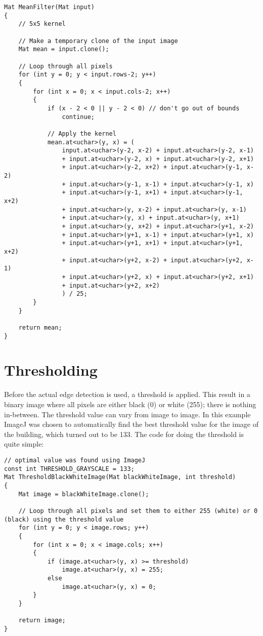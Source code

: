 \begin{lstlisting}
Mat MeanFilter(Mat input)
{
	// 5x5 kernel

	// Make a temporary clone of the input image
	Mat mean = input.clone();

	// Loop through all pixels
	for (int y = 0; y < input.rows-2; y++)
	{
		for (int x = 0; x < input.cols-2; x++)
		{
			if (x - 2 < 0 || y - 2 < 0) // don't go out of bounds
				continue;

			// Apply the kernel
			mean.at<uchar>(y, x) = (
				input.at<uchar>(y-2, x-2) + input.at<uchar>(y-2, x-1)
				+ input.at<uchar>(y-2, x) + input.at<uchar>(y-2, x+1)
				+ input.at<uchar>(y-2, x+2) + input.at<uchar>(y-1, x-2)
				+ input.at<uchar>(y-1, x-1) + input.at<uchar>(y-1, x)
				+ input.at<uchar>(y-1, x+1) + input.at<uchar>(y-1, x+2)
				+ input.at<uchar>(y, x-2) + input.at<uchar>(y, x-1)
				+ input.at<uchar>(y, x) + input.at<uchar>(y, x+1)
				+ input.at<uchar>(y, x+2) + input.at<uchar>(y+1, x-2)
				+ input.at<uchar>(y+1, x-1) + input.at<uchar>(y+1, x)
				+ input.at<uchar>(y+1, x+1) + input.at<uchar>(y+1, x+2)
				+ input.at<uchar>(y+2, x-2)	+ input.at<uchar>(y+2, x-1)
				+ input.at<uchar>(y+2, x) + input.at<uchar>(y+2, x+1)
				+ input.at<uchar>(y+2, x+2)
				) / 25;
		}
	}

	return mean;
}
\end{lstlisting}

\section{Thresholding}
Before the actual edge detection is used, a threshold is applied. This result in a binary image where all pixels are either black (0) or white (255); there is nothing in-between. The threshold value can vary from image to image. In this example ImageJ was chosen to automatically find the best threshold value for the image of the building, which turned out to be 133. The code  for doing the threshold is quite simple:

\begin{lstlisting}
// optimal value was found using ImageJ
const int THRESHOLD_GRAYSCALE = 133; 
Mat ThresholdBlackWhiteImage(Mat blackWhiteImage, int threshold)
{
	Mat image = blackWhiteImage.clone();

	// Loop through all pixels and set them to either 255 (white) or 0 (black) using the threshold value
	for (int y = 0; y < image.rows; y++)
	{
		for (int x = 0; x < image.cols; x++)
		{
			if (image.at<uchar>(y, x) >= threshold)
				image.at<uchar>(y, x) = 255;
			else
				image.at<uchar>(y, x) = 0;
		}
	}

	return image;
}
\end{lstlisting}

